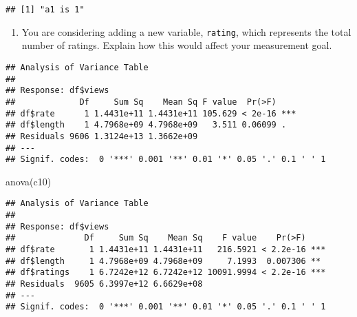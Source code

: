 \documentclass[
]{article}
\newenvironment{Shaded}{\begin{snugshade}}{\end{snugshade}}
\newcommand{\CommentTok}[1]{\textcolor[rgb]{0.56,0.35,0.01}{\textit{#1}}}
\newcommand{\FunctionTok}[1]{\textcolor[rgb]{0.00,0.00,0.00}{#1}}
\newcommand{\NormalTok}[1]{#1}
\newcommand{\OtherTok}[1]{\textcolor[rgb]{0.56,0.35,0.01}{#1}}
\newcommand{\SpecialCharTok}[1]{\textcolor[rgb]{0.00,0.00,0.00}{#1}}
\providecommand{\tightlist}{%
  \setlength{\itemsep}{0pt}\setlength{\parskip}{0pt}}
\begin{document}
\begin{verbatim}
## [1] "a1 is 1"
\end{verbatim}

\begin{enumerate}
\def\labelenumi{\alph{enumi}.}
\setcounter{enumi}{2}
\tightlist
\item
  You are considering adding a new variable, \texttt{rating}, which
  represents the total number of ratings. Explain how this would affect
  your measurement goal.
\end{enumerate}

\begin{Shaded}
\end{Shaded}

\begin{verbatim}
## Analysis of Variance Table
## 
## Response: df$views
##             Df     Sum Sq    Mean Sq F value  Pr(>F)    
## df$rate      1 1.4431e+11 1.4431e+11 105.629 < 2e-16 ***
## df$length    1 4.7968e+09 4.7968e+09   3.511 0.06099 .  
## Residuals 9606 1.3124e+13 1.3662e+09                    
## ---
## Signif. codes:  0 '***' 0.001 '**' 0.01 '*' 0.05 '.' 0.1 ' ' 1
\end{verbatim}

\begin{Shaded}
\begin{Highlighting}[]
\FunctionTok{anova}\NormalTok{(c10)}
\end{Highlighting}
\end{Shaded}

\begin{verbatim}
## Analysis of Variance Table
## 
## Response: df$views
##              Df     Sum Sq    Mean Sq    F value    Pr(>F)    
## df$rate       1 1.4431e+11 1.4431e+11   216.5921 < 2.2e-16 ***
## df$length     1 4.7968e+09 4.7968e+09     7.1993  0.007306 ** 
## df$ratings    1 6.7242e+12 6.7242e+12 10091.9994 < 2.2e-16 ***
## Residuals  9605 6.3997e+12 6.6629e+08                         
## ---
## Signif. codes:  0 '***' 0.001 '**' 0.01 '*' 0.05 '.' 0.1 ' ' 1
\end{verbatim}
\end{document}
